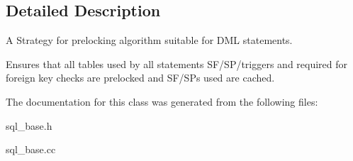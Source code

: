 \subsection{Detailed Description}
A Strategy for prelocking algorithm suitable for D\+ML statements.

Ensures that all tables used by all statement\textquotesingle{}s S\+F/\+S\+P/triggers and required for foreign key checks are prelocked and S\+F/\+S\+Ps used are cached. 

The documentation for this class was generated from the following files\+:\begin{DoxyCompactItemize}
\item 
sql\+\_\+base.\+h\item 
sql\+\_\+base.\+cc\end{DoxyCompactItemize}
